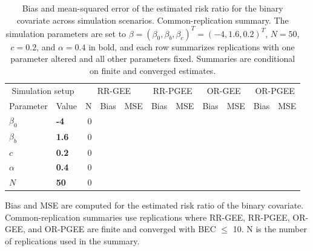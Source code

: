 \begin{table}[htbp]
\centering
\scriptsize
\setlength{\tabcolsep}{4pt}
\renewcommand{\arraystretch}{1.15}
\caption{Bias and mean-squared error of the estimated risk ratio for the binary covariate across simulation scenarios. Common-replication summary. The simulation parameters are set to $\beta = (\beta_0, \beta_b, \beta_c)^T = (-4, 1.6, 0.2)^T$, $N = 50$, $c = 0.2$, and $\alpha = 0.4$ in bold, and each row summarizes replications with one parameter altered and all other parameters fixed. Summaries are conditional on finite and converged estimates.}
\begin{tabular}{ll|rrr|rr|rr|rr}
\hline
\multicolumn{2}{c|}{Simulation setup} & \multicolumn{3}{c|}{RR-GEE} & \multicolumn{2}{c|}{RR-PGEE} & \multicolumn{2}{c|}{OR-GEE} & \multicolumn{2}{c}{OR-PGEE} \\
Parameter & Value & N & Bias & MSE & Bias & MSE & Bias & MSE & Bias & MSE \\
\hline
$\beta_0$ & \textbf{-4} & 0 &  &  &  &  &  &  &  &  \\
\hline
$\beta_b$ & \textbf{1.6} & 0 &  &  &  &  &  &  &  &  \\
\hline
$c$ & \textbf{0.2} & 0 &  &  &  &  &  &  &  &  \\
\hline
$\alpha$ & \textbf{0.4} & 0 &  &  &  &  &  &  &  &  \\
\hline
$N$ & \textbf{50} & 0 &  &  &  &  &  &  &  &  \\
\hline
\end{tabular}
\begin{flushleft}
\footnotesize Bias and MSE are computed for the estimated risk ratio of the binary covariate. Common-replication summaries use replications where RR-GEE, RR-PGEE, OR-GEE, and OR-PGEE are finite and converged with BEC $\leq$ 10. N is the number of replications used in the summary.
\end{flushleft}
\end{table}

